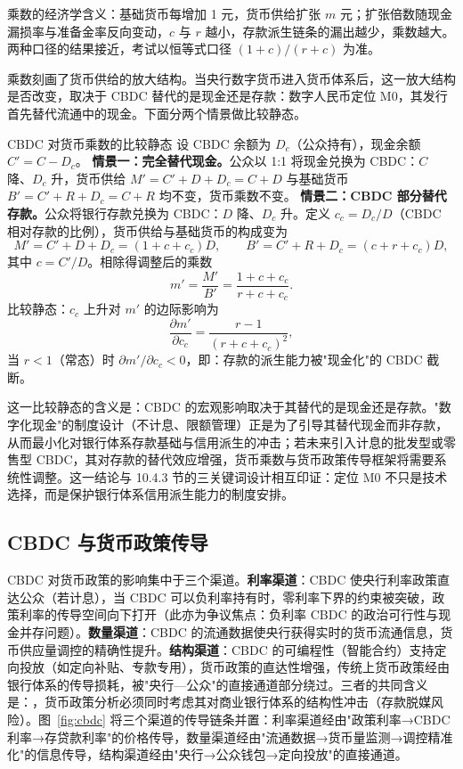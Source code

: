 乘数的经济学含义：基础货币每增加 1 元，货币供给扩张 $m$ 元；扩张倍数随现金漏损率与准备金率反向变动，$c$ 与 $r$ 越小，存款派生链条的漏出越少，乘数越大。两种口径的结果接近，考试以恒等式口径 $(1+c)/(r+c)$ 为准。

乘数刻画了货币供给的放大结构。当央行数字货币进入货币体系后，这一放大结构是否改变，取决于 CBDC 替代的是现金还是存款：数字人民币定位 M0，其发行首先替代流通中的现金。下面分两个情景做比较静态。

\begin{derivation}{CBDC 对货币乘数的比较静态}{}
设 CBDC 余额为 $D_c$（公众持有），现金余额 $C' = C - D_c$。
\textbf{情景一：完全替代现金。}公众以 1:1 将现金兑换为 CBDC：$C$ 降、$D_c$ 升，货币供给 $M' = C' + D + D_c = C + D$ 与基础货币 $B' = C' + R + D_c = C + R$ 均不变，货币乘数不变。
\textbf{情景二：CBDC 部分替代存款。}公众将银行存款兑换为 CBDC：$D$ 降、$D_c$ 升。定义 $c_c = D_c/D$（CBDC 相对存款的比例），货币供给与基础货币的构成变为
\[
M' = C' + D + D_c = (1 + c + c_c)D, \qquad
B' = C' + R + D_c = (c + r + c_c)D,
\]
其中 $c = C'/D$。相除得调整后的乘数
\[
m' = \frac{M'}{B'} = \frac{1 + c + c_c}{r + c + c_c}.
\]
比较静态：$c_c$ 上升对 $m'$ 的边际影响为
\[
\frac{\partial m'}{\partial c_c} = \frac{r - 1}{(r + c + c_c)^2},
\]
当 $r < 1$（常态）时 $\partial m'/\partial c_c < 0$，即：存款的派生能力被"现金化"的 CBDC 截断。
\end{derivation}

这一比较静态的含义是：CBDC 的宏观影响取决于其替代的是现金还是存款。"数字化现金"的制度设计（不计息、限额管理）正是为了引导其替代现金而非存款，从而最小化对银行体系存款基础与信用派生的冲击；若未来引入计息的批发型或零售型 CBDC，其对存款的替代效应增强，货币乘数与货币政策传导框架将需要系统性调整。这一结论与 10.4.3 节的三关键词设计相互印证：定位 M0 不只是技术选择，而是保护银行体系信用派生能力的制度安排。

\subsection{CBDC 与货币政策传导}

CBDC 对货币政策的影响集中于三个渠道。\textbf{利率渠道}：CBDC 使央行利率政策直达公众（若计息），当 CBDC 可以负利率持有时，零利率下界的约束被突破，政策利率的传导空间向下打开（此亦为争议焦点：负利率 CBDC 的政治可行性与现金并存问题）。\textbf{数量渠道}：CBDC 的流通数据使央行获得实时的货币流通信息，货币供应量调控的精确性提升。\textbf{结构渠道}：CBDC 的可编程性（智能合约）支持定向投放（如定向补贴、专款专用），货币政策的直达性增强，传统上货币政策经由银行体系的传导损耗，被"央行—公众"的直接通道部分绕过。三者的共同含义是：，货币政策分析必须同时考虑其对商业银行体系的结构性冲击（存款脱媒风险）。图~\ref{fig:cbdc} 将三个渠道的传导链条并置：利率渠道经由"政策利率→CBDC 利率→存贷款利率"的价格传导，数量渠道经由"流通数据→货币量监测→调控精准化"的信息传导，结构渠道经由"央行→公众钱包→定向投放"的直接通道。

